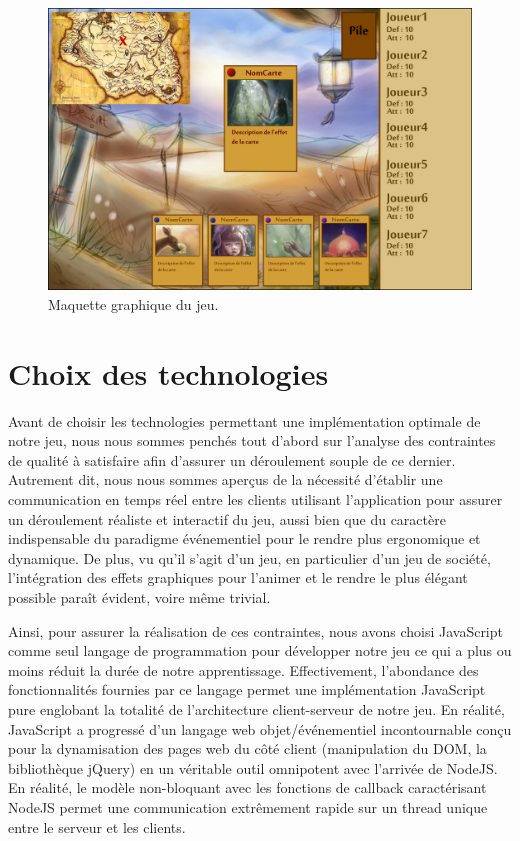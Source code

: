 \documentclass[12pt]{report}
\begin{document}
    \begin{figure}[h!]
    	\centering
	    \includegraphics[scale=2.8]{mock-up.png}
	    \caption{Maquette graphique du jeu.}
	    \label{fig:maquette}
    \end{figure}




    \section{Choix des technologies}
		Avant de choisir les technologies permettant une implémentation optimale de notre jeu, nous nous sommes penchés tout d'abord sur l'analyse des contraintes de qualité à satisfaire afin d'assurer un déroulement souple de ce dernier. Autrement dit, nous nous sommes aperçus de la nécessité d'établir une communication en temps réel entre les clients utilisant l'application pour assurer un déroulement réaliste et interactif du jeu, aussi bien que du caractère indispensable du paradigme événementiel pour le rendre plus ergonomique et dynamique. De plus, vu qu'il s'agit d'un jeu, en particulier d'un jeu de société, l'intégration des effets graphiques pour l'animer et le rendre le plus élégant possible paraît évident, voire même trivial.

		Ainsi, pour assurer la réalisation de ces contraintes, nous avons choisi JavaScript comme seul langage de programmation pour développer notre jeu ce qui a plus ou moins réduit la durée de notre apprentissage. Effectivement, l'abondance des fonctionnalités fournies par ce langage permet une implémentation JavaScript pure englobant la totalité de l'architecture client-serveur de notre jeu. En réalité, JavaScript a progressé d'un langage web objet/événementiel incontournable conçu pour la dynamisation des pages web du côté client (manipulation du DOM, la bibliothèque jQuery) en un véritable outil omnipotent avec l'arrivée de NodeJS. En réalité, le modèle non-bloquant avec les fonctions de callback caractérisant NodeJS permet une communication extrêmement rapide sur un thread unique entre le serveur et les clients.
\end{document}
